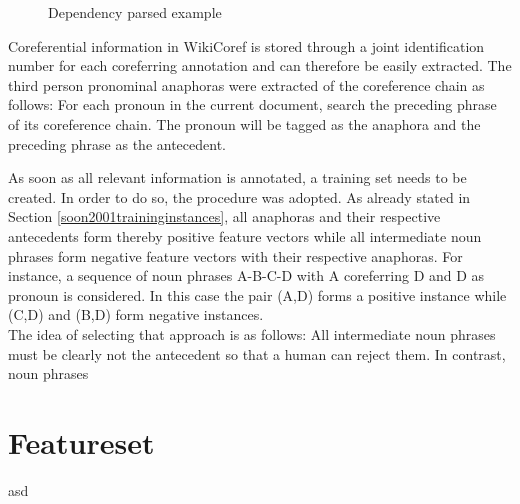 \begin{figure}[h]
	\centering
	\caption{Dependency parsed example}
	\label{figure:dependencytree}
\end{figure}

Coreferential information in WikiCoref is stored through a joint identification number for each coreferring annotation and can therefore be easily extracted. The third person pronominal anaphoras were extracted of the coreference chain as follows: For each pronoun in the current document, search the preceding phrase of its coreference chain. The pronoun will be tagged as the anaphora and the preceding phrase as the antecedent. 

As soon as all relevant information is annotated, a training set needs to be created. In order to do so, the procedure \cite{soon2001machine} was adopted. As already stated in Section \ref{soon2001traininginstances}, all anaphoras and their respective antecedents form thereby positive feature vectors while all intermediate noun phrases form negative feature vectors with their respective anaphoras. For instance, a sequence of noun phrases A-B-C-D with A coreferring D and D as pronoun is considered. In this case the pair (A,D) forms a positive instance while (C,D) and (B,D) form negative instances.\\
The idea of selecting that approach is as follows: All intermediate noun phrases must be clearly not the antecedent so that a human can reject them. In contrast, noun phrases %

\section{Featureset}
asd

